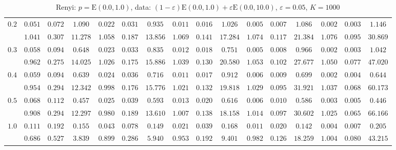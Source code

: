 \begin{table}[ht]
\begin{center}
\begin{tabular}{|c|ccc|ccc|ccc|ccc|ccc|}
\hline 
$0.2$ & $ 0.051 $ & $ 0.072 $ & $ 1.090 $ & $ 0.022 $ & $ 0.031 $ & $ 0.935 $ & $ 0.011 $ & $ 0.016 $ & $ 1.026 $ & $ 0.005 $ & $ 0.007 $ & $ 1.086 $ & $ 0.002 $ & $ 0.003 $ & $ 1.146 $\\ 
 & $ 1.041 $ & $ 0.307 $ & $ 11.278 $ & $ 1.058 $ & $ 0.187 $ & $ 13.856 $ & $ 1.069 $ & $ 0.141 $ & $ 17.284 $ & $ 1.074 $ & $ 0.117 $ & $ 21.384 $ & $ 1.076 $ & $ 0.095 $ & $ 30.869 $\\ 
\hline 
$0.3$ & $ 0.058 $ & $ 0.094 $ & $ 0.648 $ & $ 0.023 $ & $ 0.033 $ & $ 0.835 $ & $ 0.012 $ & $ 0.018 $ & $ 0.751 $ & $ 0.005 $ & $ 0.008 $ & $ 0.966 $ & $ 0.002 $ & $ 0.003 $ & $ 1.042 $\\ 
 & $ 0.962 $ & $ 0.275 $ & $ 14.025 $ & $ 1.026 $ & $ 0.175 $ & $ 15.886 $ & $ 1.039 $ & $ 0.130 $ & $ 20.580 $ & $ 1.053 $ & $ 0.102 $ & $ 27.677 $ & $ 1.050 $ & $ 0.077 $ & $ 47.020 $\\ 
\hline 
$0.4$ & $ 0.059 $ & $ 0.094 $ & $ 0.639 $ & $ 0.024 $ & $ 0.036 $ & $ 0.716 $ & $ 0.011 $ & $ 0.017 $ & $ 0.912 $ & $ 0.006 $ & $ 0.009 $ & $ 0.699 $ & $ 0.002 $ & $ 0.004 $ & $ 0.644 $\\ 
 & $ 0.954 $ & $ 0.294 $ & $ 12.342 $ & $ 0.998 $ & $ 0.176 $ & $ 15.776 $ & $ 1.021 $ & $ 0.132 $ & $ 19.818 $ & $ 1.029 $ & $ 0.095 $ & $ 31.921 $ & $ 1.037 $ & $ 0.068 $ & $ 60.173 $\\ 
\hline 
$0.5$ & $ 0.068 $ & $ 0.112 $ & $ 0.457 $ & $ 0.025 $ & $ 0.039 $ & $ 0.593 $ & $ 0.013 $ & $ 0.020 $ & $ 0.616 $ & $ 0.006 $ & $ 0.010 $ & $ 0.586 $ & $ 0.003 $ & $ 0.005 $ & $ 0.446 $\\ 
 & $ 0.908 $ & $ 0.294 $ & $ 12.297 $ & $ 0.980 $ & $ 0.189 $ & $ 13.610 $ & $ 1.007 $ & $ 0.138 $ & $ 18.158 $ & $ 1.014 $ & $ 0.097 $ & $ 30.602 $ & $ 1.025 $ & $ 0.065 $ & $ 66.166 $\\ 
\hline 
$1.0$ & $ 0.111 $ & $ 0.192 $ & $ 0.155 $ & $ 0.043 $ & $ 0.078 $ & $ 0.149 $ & $ 0.021 $ & $ 0.039 $ & $ 0.168 $ & $ 0.011 $ & $ 0.020 $ & $ 0.142 $ & $ 0.004 $ & $ 0.007 $ & $ 0.205 $\\ 
 & $ 0.686 $ & $ 0.527 $ & $ 3.839 $ & $ 0.899 $ & $ 0.286 $ & $ 5.940 $ & $ 0.953 $ & $ 0.192 $ & $ 9.401 $ & $ 0.982 $ & $ 0.126 $ & $ 18.259 $ & $ 1.004 $ & $ 0.080 $ & $ 43.215 $\\ 
\hline 
\end{tabular}
\caption{Renyi: $p = \mathrm{E}(0.0,1.0)$, data: $(1-\varepsilon)\mathrm{E}(0.0,1.0) + \varepsilon \mathrm{E}(0.0,10.0)$, $\varepsilon =  0.05$, $K = 1000$} 
\end{center}
\end{table}
